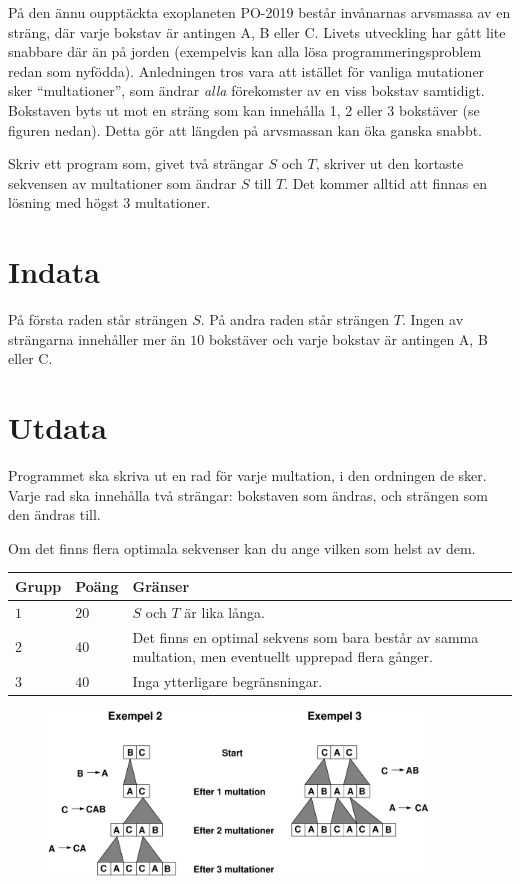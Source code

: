 \noindent

På den ännu oupptäckta exoplaneten PO-2019 består invånarnas arvsmassa av en sträng, 
där varje bokstav är antingen A, B eller C. Livets utveckling har gått lite snabbare 
där än på  jorden (exempelvis kan alla lösa programmeringsproblem redan som nyfödda). 
Anledningen tros vara att istället för vanliga mutationer sker ``multationer'', 
som ändrar {\em alla} förekomster av en viss bokstav samtidigt. 
Bokstaven byts ut mot en sträng som kan innehålla 1, 2 eller 3 bokstäver (se figuren nedan). 
Detta gör att längden på arvsmassan kan öka ganska snabbt.

Skriv ett program som, givet två strängar $S$ och $T$, 
skriver ut den kortaste sekvensen av multationer som ändrar $S$ till $T$. 
Det kommer alltid att finnas en lösning med högst $3$ multationer.

\section*{Indata}
På första raden står strängen $S$. På andra raden står strängen $T$. 
Ingen av strängarna innehåller mer än $10$ bokstäver och varje 
bokstav är antingen A, B eller C.

\section*{Utdata}
Programmet ska skriva ut en rad för varje multation, i den ordningen de sker. 
Varje rad ska innehålla två strängar: bokstaven som ändras, och strängen som den ändras till.

Om det finns flera optimala sekvenser kan du ange vilken som helst av dem.

\noindent
\begin{tabular}{| l | l | p{12cm} |}
  \hline
  \textbf{Grupp} & \textbf{Poäng} & \textbf{Gränser} \\ \hline
  $1$    & $20$       & $S$ och $T$ är lika långa. \\ \hline
  $2$    & $40$       & Det finns en optimal sekvens som bara består av samma multation, men eventuellt upprepad flera gånger. \\ \hline
  $3$    & $40$       & Inga ytterligare begränsningar. \\ \hline
\end{tabular}


\begin{figure}[!h]
  \centering
      \includegraphics[width=0.9\textwidth]{multationer1.pdf}
\end{figure}
